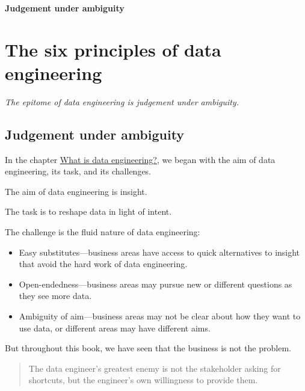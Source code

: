 \documentclass[10pt,openany,10pt]{book}
\providecommand{\tightlist}{%
  \setlength{\itemsep}{0pt}\setlength{\parskip}{0pt}}
\begin{document}
\newpage

\thispagestyle{empty}
\hypertarget{docs-judgement-under-ambiguity}{}
\vspace*{0.34\textheight}
\begin{center}
{\Huge\bfseries Judgement under ambiguity}
\end{center}
\newpage

\chapter{The six principles of data
engineering}\label{docs-judgement-under-ambiguity-the-six-principles-of-data-engineering}

\emph{The epitome of data engineering is judgement under ambiguity.}

\section{Judgement under ambiguity}\label{judgement-under-ambiguity}

In the chapter \hyperref[docs-foundations-what-is-data-engineering]{What
is data engineering?}, we began with the aim of data engineering, its
task, and its challenges.

The aim of data engineering is insight.

The task is to reshape data in light of intent.

The challenge is the fluid nature of data engineering:

\begin{itemize}
\tightlist
\item
  Easy substitutes---business areas have access to quick alternatives to
  insight that avoid the hard work of data engineering.
\item
  Open-endedness---business areas may pursue new or different questions
  as they see more data.
\item
  Ambiguity of aim---business areas may not be clear about how they want
  to use data, or different areas may have different aims.
\end{itemize}

But throughout this book, we have seen that the business is not the
problem.

\begin{quote}
The data engineer's greatest enemy is not the stakeholder asking for
shortcuts, but the engineer's own willingness to provide them.
\end{quote}
\end{document}
